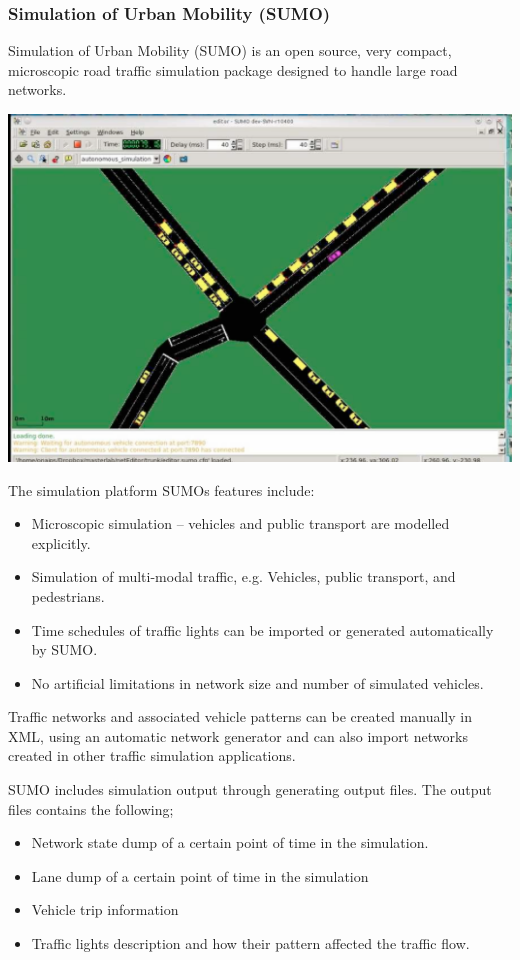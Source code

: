 \subsubsection{Simulation of Urban Mobility (SUMO)}
	Simulation of Urban Mobility (SUMO) is an open source, very compact, microscopic road traffic simulation package designed to handle large road networks\cite{EM1}.
	\begin{center}
	\includegraphics[scale=0.3]{./images/SUMO.png}
	\end{center}
	The simulation platform SUMOs features include:
	\begin{itemize}
		\item Microscopic simulation – vehicles and public transport are modelled explicitly.
		\item Simulation of multi-modal traffic, e.g. Vehicles, public transport, and pedestrians.
		\item Time schedules of traffic lights can be imported or generated automatically by SUMO.
		\item No artificial limitations in network size and number of simulated vehicles\cite{EM1}.
	\end{itemize}

	Traffic networks and associated vehicle patterns can be created manually in XML, using an automatic network generator and can also import networks created in other traffic simulation applications.
	
	SUMO includes simulation output through generating output files. The output files contains the following;
	
	\begin{itemize}
		\item Network state dump of a certain point of time in the simulation.
		\item Lane dump of a certain point of time in the simulation
		\item Vehicle trip information
		\item Traffic lights description and how their pattern affected the traffic flow.
	\end{itemize}
	
